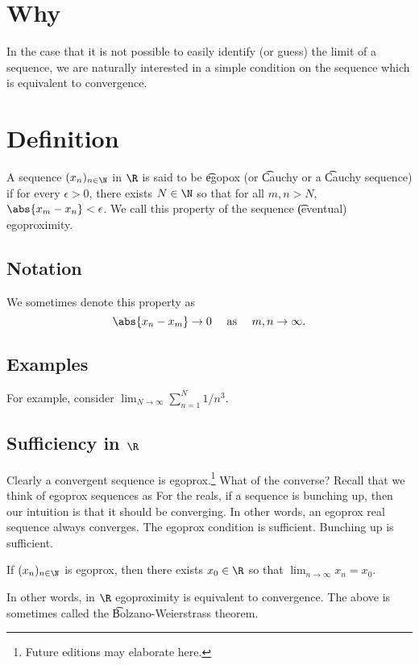 

\section*{Why}

In the case that it is not possible to easily identify (or guess) the limit of a sequence, we are naturally interested in a simple condition on the sequence which is equivalent to convergence.

\section*{Definition}

A sequence $(x_n)_{n \in \N  }$ in $\R $ is said to be \t{egopox} (or \t{Cauchy} or a \t{Cauchy sequence}) if for every $\epsilon  > 0$, there exists $N \in \N  $ so that for all $m, n > N$, $\abs{x_m - x_n} < \epsilon $.
We call this property of the sequence \t{(eventual) egoproximity}.

\subsection*{Notation}

We sometimes denote this property as
    \[
\abs{x_n - x_m} \to 0 \quad \text{ as } \quad m, n \to \infty.
    \]

\subsection*{Examples}

For example, consider $\lim_{N \to \infty} \sum_{n = 1}^{N} 1/n^3$.

\subsection*{Sufficiency in $\R $}

Clearly a convergent sequence is egoprox.\footnote{Future editions may elaborate here.}
What of the converse?
Recall that we think of egoprox sequences as 
For the reals, if a sequence is bunching up, then our intuition is that it should be converging.
In other words, an egoprox real sequence always converges.
The egoprox condition is sufficient.
Bunching up is sufficient.

\begin{proposition}
If $(x_n)_{n \in \N  }$ is egoprox, then there exists $x_0 \in \R $ so that $\lim_{n \to \infty} x_n = x_0$.\end{proposition}
In other words, in $\R $ egoproximity is equivalent to convergence.
The above is sometimes called the \t{Bolzano-Weierstrass theorem}.

\blankpage